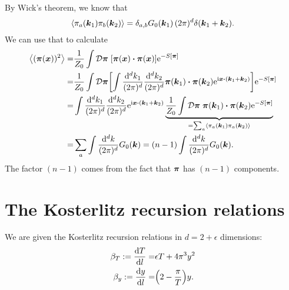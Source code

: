 \documentclass[11pt,letter, swedish, english
]{article}
\begin{document}
By Wick's theorem, we know that
\begin{equation}
\ev{\pi_a(\vb*k_1)\pi_b(\vb*k_2)}
= \delta_{a, b} G_0(\vb*k_1) \,(2\pi)^d \delta(\vb*k_1 + \vb*k_2).
\end{equation}
We can use that to calculate
\begin{equation}
\begin{aligned}
\ev{(\vb*\pi(\vb*x))^2} =& \frac{1}{Z_0}
\int \mathcal{D}\vb*\pi\; 
[\vb*\pi(\vb*x)\vdot\vb*\pi(\vb*x)] \ee^{-S[\vb*\pi]}\\
=& \frac{1}{Z_0} \int \mathcal{D}\vb*\pi
\qty[\int\frac{\rd^dk_1}{(2\pi)^d}\frac{\rd^dk_2}{(2\pi)^d}
\vb*\pi(\vb*k_1)\vdot\vb*\pi(\vb*k_2) \ee^{\ii\vb*x\vdot(\vb*k_1+\vb*k_2)}]
\ee^{-S[\vb*\pi]} \\
=& \int\frac{\rd^dk_1}{(2\pi)^d}\frac{\rd^dk_2}{(2\pi)^d}
\ee^{\ii\vb*x\vdot(\vb*k_1+\vb*k_2)}
\underbrace{\frac{1}{Z_0} \int \mathcal{D}\vb*\pi\; 
\vb*\pi(\vb*k_1)\vdot\vb*\pi(\vb*k_2) 
\ee^{-S[\vb*\pi]}}_{=\sum_a\ev{\pi_a(\vb*k_1)\pi_a(\vb*k_2)}}\\
=& \sum_a \int\frac{\rd^dk}{(2\pi)^d}G_0(\vb*k)
= (n-1) \int\frac{\rd^dk}{(2\pi)^d}G_0(\vb*k).
\end{aligned}
\end{equation}
The factor $(n-1)$ comes from the fact that $\vb*\pi$ has $(n-1)$
components. 









\section{The Kosterlitz recursion relations}
\newcommand{\TKT}{T_{\text{KT}}}

We are given the Kosterlitz recursion relations in $d=2+\epsilon$
dimensions:
\begin{align}
\label{eq:2_dT/dl}
\beta_T := \dv{T}{l} =& \epsilon T +4\pi^3y^2\\
\label{eq:2_dy/dl}
\beta_y := \dv{y}{l} =& \qty(2 -\frac{\pi}{T})y.
\end{align}
\end{document}

